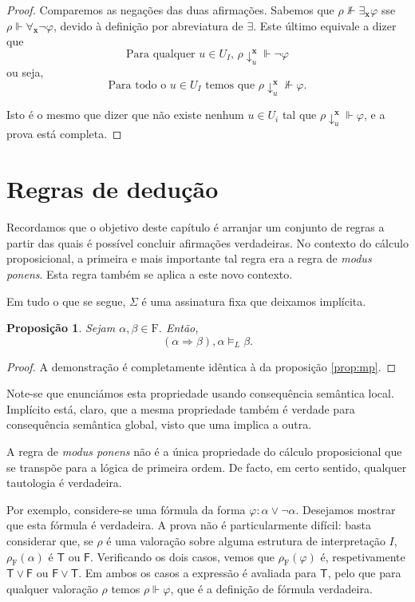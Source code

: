 \documentclass{report}
\newtheorem{prop}{Proposição}
\theoremstyle{definition}
\theoremstyle{remark}
\renewcommand{\bf}[1]{\mathbf{#1}}
\newcommand{\F}{\mathrm{F}}
\newcommand{\lt}{\mathsf{T}}
\newcommand{\lf}{\mathsf{F}}
\newcommand{\imply}{\mathbin{\Rightarrow}}
\begin{document}
	\begin{proof}
	Comparemos as negações das duas afirmações. Sabemos que $\rho \nVdash \exists_{\bf x} \varphi$ sse $\rho \Vdash \forall_{\bf x} \neg \varphi$, devido à definição por abreviatura de $\exists$. Este último equivale a dizer que
\[\text{Para qualquer $u \in U_I$, } \rho\!\downarrow^{\bf x}_u \Vdash \neg \varphi\]
ou seja,
\[\text{Para todo o $u \in U_I$ temos que } \rho\!\downarrow^{\bf x}_u \nVdash \varphi.\]

Isto é o mesmo que dizer que não existe nenhum $u \in U_i$ tal que $\rho\!\downarrow^{\bf x}_u \Vdash \varphi$, e a prova está completa.
	\end{proof}
	
	\section{Regras de dedução}
	
	Recordamos que o objetivo deste capítulo é arranjar um conjunto de regras a partir das quais é possível concluir afirmações verdadeiras. No contexto do cálculo proposicional, a primeira e mais importante tal regra era a regra de \textit{modus ponens}. Esta regra também se aplica a este novo contexto.
	
	Em tudo o que se segue, $\Sigma$ é uma assinatura fixa que deixamos implícita.
	
	\begin{prop}
	Sejam $\alpha, \beta \in \F$. Então,
	\[(\alpha \imply \beta), \alpha \vDash_L \beta.\]
	\end{prop}
	
	\begin{proof}
	A demonstração é completamente idêntica à da proposição \ref{prop:mp}.
	\end{proof}
	
	Note-se que enunciámos esta propriedade usando consequência semântica local. Implícito está, claro, que a mesma propriedade também é verdade para consequência semântica global, visto que uma implica a outra.
	
	A regra de \emph{modus ponens} não é a única propriedade do cálculo proposicional que se transpõe para a lógica de primeira ordem. De facto, em certo sentido, qualquer tautologia é verdadeira.
	
	Por exemplo, considere-se uma fórmula da forma $\varphi : \alpha \lor \neg \alpha$. Desejamos mostrar que esta fórmula é verdadeira. A prova não é particularmente difícil: basta considerar que, se $\rho$ é uma valoração sobre alguma estrutura de interpretação $I$, $\rho_\F(\alpha)$ é $\lt$ ou $\lf$. Verificando os dois casos, vemos que $\rho_\F(\varphi)$ é, respetivamente $\lt \lor \lf$ ou $\lf \lor \lt$. Em ambos os casos a expressão é avaliada para $\lt$, pelo que para qualquer valoração $\rho$ temos $\rho \Vdash \varphi$, que é a definição de fórmula verdadeira.
	
\end{document}
